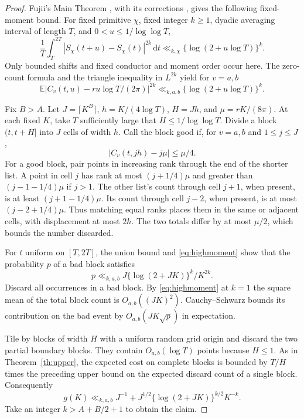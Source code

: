 \documentclass[11pt]{article}
\newcommand{\E}{\mathbb E}
\newcommand{\dd}{\,\mathrm d}
\begin{document}
\begin{proof}
Fujii's Main Theorem \cite[pp.~225--226]{fujiiI}, with its corrections
\cite{fujiiII}, gives the following fixed-moment bound.
For fixed primitive \(\chi\), fixed integer \(k\ge1\), dyadic averaging
interval of length \(T\), and \(0<u\le 1/\log\log T\),
\[
 \frac1T\int_T^{2T}|S_\chi(t+u)-S_\chi(t)|^{2k}\dd t
       \ll_{k,\chi} \{\log(2+u\log T)\}^{k}.
\]
Only bounded shifts and fixed conductor and moment order occur here.
The zero-count formula and the triangle inequality in \(L^{2k}\) yield
for \(v=a,b\)
\begin{equation}\label{eq:highmoment}
 \E|C_v(t,u)-ru\log T/(2\pi)|^{2k}
 \ll_{k,a,b}\{\log(2+u\log T)\}^{k}.
\end{equation}

Fix \(B>A\). Let \(J=\lceil K^B\rceil\), \(h=K/(4\log T)\),
\(H=Jh\), and \(\mu=rK/(8\pi)\).
At each fixed \(K\), take \(T\) sufficiently large that \(H\le1/\log\log T\).
Divide a block \((t,t+H]\) into \(J\) cells of width \(h\).
Call the block good if, for \(v=a,b\) and \(1\le j\le J\),
\[
 |C_v(t,jh)-j\mu|\le\mu/4 .
\]
For a good block, pair points in increasing rank through the end of the
shorter list. A point in cell \(j\) has rank at most \((j+1/4)\mu\)
and greater than \((j-1-1/4)\mu\) if \(j>1\).
The other list's count through cell \(j+1\), when present, is at least
\((j+1-1/4)\mu\). Its count through cell \(j-2\), when present, is at most
\((j-2+1/4)\mu\). Thus matching equal ranks places them in the same
or adjacent cells, with displacement at most \(2h\). The two totals differ
by at most \(\mu/2\), which bounds the number discarded.

For \(t\) uniform on \([T,2T]\), the union bound and \eqref{eq:highmoment}
show that the probability \(p\) of a bad block satisfies
\[
 p\ll_{k,a,b} J\{\log(2+JK)\}^{k}/K^{2k}.
\]
Discard all occurrences in a bad block. By \eqref{eq:highmoment} at \(k=1\)
the square mean of the total block count is \(O_{a,b}((JK)^2)\).
Cauchy--Schwarz bounds its contribution on the bad event by
\(O_{a,b}(JK\sqrt p)\) in expectation.

Tile by blocks of width \(H\) with a uniform random grid origin and
discard the two partial boundary blocks. They contain \(O_{a,b}(\log T)\)
points because \(H\le1\). As in Theorem~\ref{th:upper}, the expected cost
on complete blocks is bounded by \(T/H\) times the preceding upper bound
on the expected discard count of a single block. Consequently
\[
 g(K)\ll_{k,a,b} J^{-1}
       +J^{1/2}\{\log(2+JK)\}^{k/2}K^{-k}.
\]
Take an integer \(k>A+B/2+1\) to obtain the claim.
\end{proof}
\end{document}
